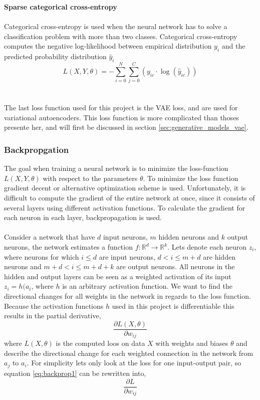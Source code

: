 \documentclass[11pt]{article}
\begin{document}
\textbf{Sparse categorical cross-entropy}
\\ \\
Categorical cross-entropy is used when the neural network has to solve a classification problem with more than two classes. Categorical cross-entropy computes the negative log-likelihood between empirical distribution $y_{i}$ and the predicted probability distribution $\hat{y}_{i}$
\begin{equation}
    L(X, Y, \theta) = - \sum_{i = 0}^{N} \sum_{j = 0}^{C} (y_{ic} \cdot \log (\hat{y}_{ic}))
\end{equation}
\\ \\
The last loss function used for this project is the VAE loss, and are used for variational autoencoders. This loss function is more complicated than thoses presente her, and will first be discussed in section \ref{sec:generative_models_vae}.


\subsubsection{Backpropgation}
The goal when training a neural network is to minimize the loss-function $L(X, Y, \theta)$ with respect to the parameters $\theta$. To minimize the loss function gradient decent or alternative optimization scheme is used. Unfortunately, it is difficult to compute the gradient of the entire network at once, since it consists of several layers using different activation functions. To calculate the gradient for each neuron in each layer, backpropagation is used.
\\ \\
Consider a network that have $d$ input neurons, $m$ hidden neurons and $k$ output neurons, the network estimates a function $f : \mathbb{R}^{d} \rightarrow \mathbb{R}^{k}$. Lets denote each neuron $z_{i}$, where neurons for which $i \leq d$ are input neurons, $d < i \leq m + d$ are hidden neurons and $m + d < i \leq m + d + k$ are output neurons. All neurons in the hidden and output layers can be seen as a weighted activation of its input $z_{i} = h(a_{i}$, where $h$ is an arbitrary activation function. We want to find the directional changes for all weights in the network in regards to the loss function. Because the activation functions $h$ used in this project is differentiable this results in the partial derivative,
\begin{equation}\label{eq:backprop1}
    \frac{\partial L(X, \theta)}{\partial w_{ij}}
\end{equation}
where $L(X, \theta)$ is the computed loos on data $X$ with weights and biases $\theta$ and describe the directional change for each weighted connection in the network from $a_{j}$ to $a_{i}$. For simplicity lets only look at the loss for one input-output pair, so equation \ref{eq:backprop1} can be rewritten into,
\begin{equation}\label{eq:backprop2}
    \frac{\partial L}{\partial w_{ij}}
\end{equation}
\end{document}

